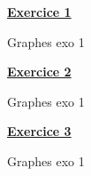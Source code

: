 \documentclass{article}
\begin{document}
    \Large{\underline{\textbf{Exercice 1}}}

    Graphes exo 1

    
    \Large{\underline{\textbf{Exercice 2}}}

    Graphes exo 1

    
    \Large{\underline{\textbf{Exercice 3}}}

    Graphes exo 1
\end{document}

